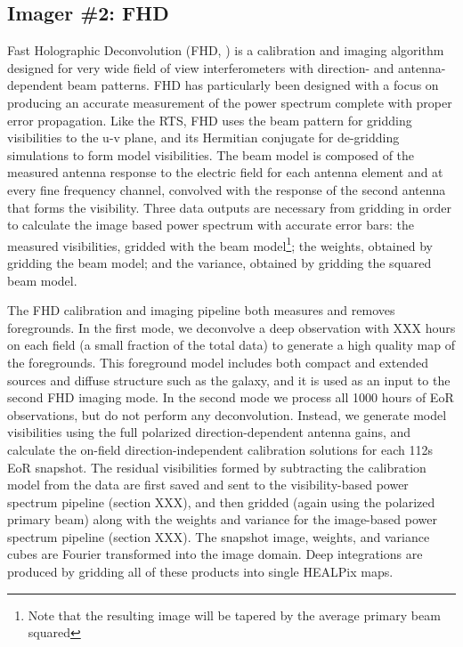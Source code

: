 \documentclass[preprint2]{aastex}
\begin{document}
\subsection{Imager \#2: FHD}
Fast Holographic Deconvolution (FHD, \cite{Sullivan:2012p9457}) is a calibration and imaging algorithm designed for very wide field of view interferometers with direction- and antenna-dependent beam patterns. FHD has particularly been designed with a focus on producing an accurate measurement of the power spectrum complete with proper error propagation. Like the RTS, FHD uses the  beam pattern for gridding visibilities to the u-v plane, and its Hermitian conjugate for de-gridding simulations to form model visibilities. The  beam model is composed of the measured antenna response to the electric field for each antenna element and at every fine frequency channel, convolved with the response of the second antenna that forms the visibility. Three data outputs are necessary from gridding in order to calculate the image based power spectrum with accurate error bars: the measured visibilities, gridded with the  beam model\footnote{Note that the resulting image will be tapered by the average primary beam squared}; the weights, obtained by gridding the  beam model; and the variance, obtained by gridding the squared beam model.

The FHD calibration and imaging pipeline both measures and removes foregrounds. In the first mode, we deconvolve a deep observation with XXX hours on each field (a small fraction of the total data) to generate a high quality map of the foregrounds. This foreground model includes both compact and extended sources and diffuse structure such as the galaxy, and it is used as an input to the second FHD imaging mode. In the second mode we process all 1000 hours of EoR observations, but do not perform any deconvolution. Instead, we generate model visibilities using the full polarized direction-dependent antenna gains, and calculate the on-field direction-independent calibration solutions for each 112s EoR snapshot. The residual visibilities formed by subtracting the calibration model from the data are first saved and sent to the visibility-based power spectrum pipeline (section XXX), and then gridded (again using the polarized primary beam) along with the weights and variance for the image-based power spectrum pipeline (section XXX). The snapshot image, weights, and variance cubes are Fourier transformed into the image domain. Deep integrations are produced by gridding all of these products into single HEALPix maps.
\end{document}
